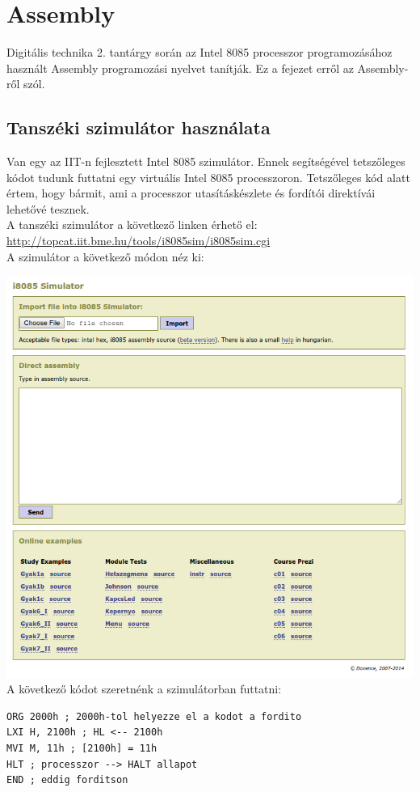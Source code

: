 \documentclass{article}
\begin{document}
\section{Assembly}
Digitális technika 2. tantárgy során az Intel 8085 processzor programozásához használt Assembly programozási nyelvet tanítják. Ez a fejezet erről az Assembly-ről szól.
\subsection{Tanszéki szimulátor használata}
Van egy az IIT-n fejlesztett Intel 8085 szimulátor. Ennek segítségével tetszőleges kódot tudunk futtatni egy virtuális Intel 8085 processzoron. Tetszőleges kód alatt értem, hogy bármit, ami a processzor utasításkészlete és fordítói direktívái lehetővé tesznek. \\
A tanszéki szimulátor a következő linken érhető el: \\
\url{http://topcat.iit.bme.hu/tools/i8085sim/i8085sim.cgi} \\
A szimulátor a következő módon néz ki:

\includegraphics[scale=0.5]{sim.png} \\
A következő kódot szeretnénk a szimulátorban futtatni:
\begin{lstlisting}[frame=single]
ORG 2000h ; 2000h-tol helyezze el a kodot a fordito
LXI H, 2100h ; HL <-- 2100h
MVI M, 11h ; [2100h] = 11h
HLT ; processzor --> HALT allapot
END ; eddig forditson
\end{lstlisting}
\end{document}
